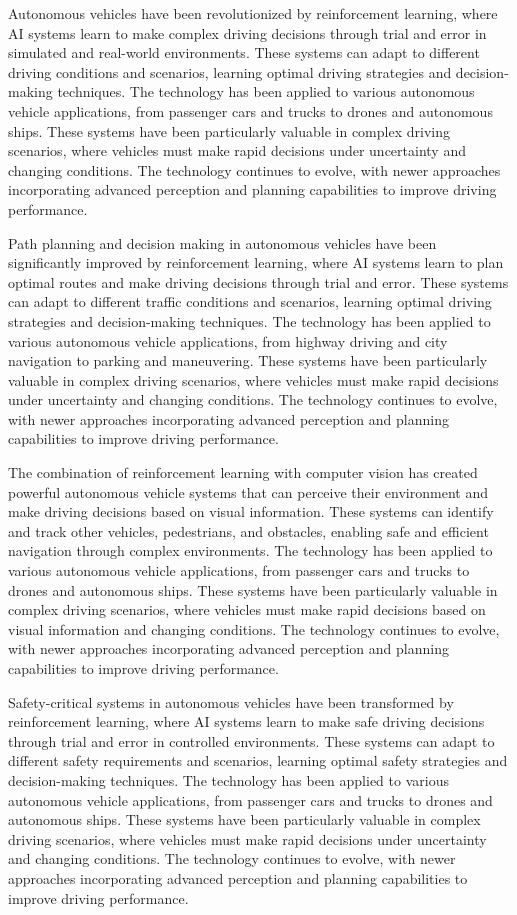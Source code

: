 Autonomous vehicles have been revolutionized by reinforcement learning, where AI systems learn to make complex driving decisions through trial and error in simulated and real-world environments. These systems can adapt to different driving conditions and scenarios, learning optimal driving strategies and decision-making techniques. The technology has been applied to various autonomous vehicle applications, from passenger cars and trucks to drones and autonomous ships. These systems have been particularly valuable in complex driving scenarios, where vehicles must make rapid decisions under uncertainty and changing conditions. The technology continues to evolve, with newer approaches incorporating advanced perception and planning capabilities to improve driving performance.

Path planning and decision making in autonomous vehicles have been significantly improved by reinforcement learning, where AI systems learn to plan optimal routes and make driving decisions through trial and error. These systems can adapt to different traffic conditions and scenarios, learning optimal driving strategies and decision-making techniques. The technology has been applied to various autonomous vehicle applications, from highway driving and city navigation to parking and maneuvering. These systems have been particularly valuable in complex driving scenarios, where vehicles must make rapid decisions under uncertainty and changing conditions. The technology continues to evolve, with newer approaches incorporating advanced perception and planning capabilities to improve driving performance.

The combination of reinforcement learning with computer vision has created powerful autonomous vehicle systems that can perceive their environment and make driving decisions based on visual information. These systems can identify and track other vehicles, pedestrians, and obstacles, enabling safe and efficient navigation through complex environments. The technology has been applied to various autonomous vehicle applications, from passenger cars and trucks to drones and autonomous ships. These systems have been particularly valuable in complex driving scenarios, where vehicles must make rapid decisions based on visual information and changing conditions. The technology continues to evolve, with newer approaches incorporating advanced perception and planning capabilities to improve driving performance.

Safety-critical systems in autonomous vehicles have been transformed by reinforcement learning, where AI systems learn to make safe driving decisions through trial and error in controlled environments. These systems can adapt to different safety requirements and scenarios, learning optimal safety strategies and decision-making techniques. The technology has been applied to various autonomous vehicle applications, from passenger cars and trucks to drones and autonomous ships. These systems have been particularly valuable in complex driving scenarios, where vehicles must make rapid decisions under uncertainty and changing conditions. The technology continues to evolve, with newer approaches incorporating advanced perception and planning capabilities to improve driving performance.


